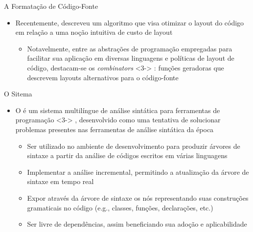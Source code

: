 \documentclass
  [ aspectratio=169,
    english,
    hyperref={citecolor=blue,colorlinks=true,linkcolor=blue,urlcolor=blue},
    brazil]
  {beamer}
\begin{document}
  \begin{frame}{A Formatação de Código-Fonte}
    \begin{itemize}
      \item<1-> Recentemente, \textcite{yelland-2015-new} descreveu um
                algoritmo que visa otimizar o layout do código em relação a uma
                noção intuitiva de custo de layout
                \begin{itemize}
                  \item<2-> Notavelmente, entre as abstrações de programação
                            empregadas para facilitar sua aplicação em diversas
                            linguagens e políticas de layout de código,
                            destacam-se os \textit{combinators}%
                            \onslide
                              <3->
                              {%
                                : funções geradoras que descrevem layouts
                                alternativos para o código-fonte}
                \end{itemize}
    \end{itemize}
  \end{frame}


  \begin{frame}{O Sitema \treesitter}
    \begin{itemize}
      \item<2-> O \treesitter \cite{tree-sitter-2023-tree} é um sistema
                multilíngue de análise sintática para ferramentas de
                programação%
                \onslide
                  <3->
                  {%
                    , desenvolvido como uma tentativa de solucionar problemas
                    presentes nas ferramentas de análise sintática da época}
                \begin{itemize}
                  \item<5-> Ser utilizado no ambiente de desenvolvimento para
                            produzir árvores de sintaxe a partir da análise de
                            códigos escritos em várias linguagens
                  \item<6-> Implementar a análise incremental, permitindo a
                            atualização da árvore de sintaxe em tempo real
                  \item<7-> Expor através da árvore de sintaxe os nós
                            representando suas construções gramaticais no
                            código (e.g., classes, funções, declarações, etc.)
                  \item<8-> Ser livre de dependências, assim beneficiando sua
                            adoção e aplicabilidade
                \end{itemize}
    \end{itemize}
  \end{frame}
\end{document}
